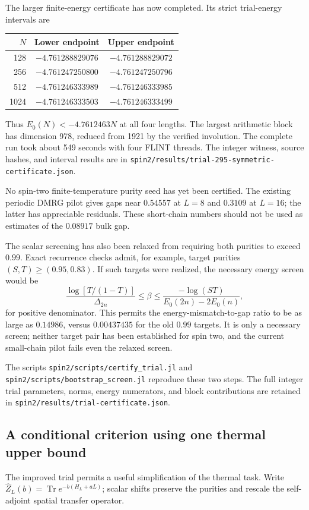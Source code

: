 \documentclass[11pt]{article}
\newcommand{\Tr}{\operatorname{Tr}}
\begin{document}
The larger finite-energy certificate has now completed. Its strict trial-energy
intervals are
\begin{center}
\begin{tabular}{rcc}
\toprule
$N$ & Lower endpoint & Upper endpoint\\
\midrule
128 & $-4.761288829076$ & $-4.761288829072$\\
256 & $-4.761247250800$ & $-4.761247250796$\\
512 & $-4.761246333989$ & $-4.761246333985$\\
1024 & $-4.761246333503$ & $-4.761246333499$\\
\bottomrule
\end{tabular}
\end{center}
Thus $E_0(N)<-4.7612463N$ at all four lengths. The largest arithmetic block
has dimension 978, reduced from 1921 by the verified involution. The complete
run took about 549 seconds with four FLINT threads. The integer witness,
source hashes, and interval results are in
\texttt{spin2/results/trial-295-symmetric-certificate.json}.

No spin-two finite-temperature purity seed has yet been certified.
The existing periodic DMRG pilot gives gaps near $0.54557$ at $L=8$ and
$0.3109$ at $L=16$; the latter has appreciable residuals. These short-chain
numbers should not be used as estimates of the $0.08917$ bulk gap.

The scalar screening has also been relaxed from requiring both purities to
exceed $0.99$. Exact recurrence checks admit, for example, target purities
$(S,T)\ge(0.95,0.83)$. If such targets were realized, the necessary energy
screen would be
\[
 \frac{\log[T/(1-T)]}{\Delta_{2n}}\le\beta
 \le\frac{-\log(ST)}{E_0(2n)-2E_0(n)},
\]
for positive denominator. This permits the energy-mismatch-to-gap ratio to
be as large as $0.14986$, versus $0.00437435$ for the old $0.99$ targets.
It is only a necessary screen; neither target pair has been established for
spin two, and the current small-chain pilot fails even the relaxed screen.

The scripts \texttt{spin2/scripts/certify\_trial.jl} and
\texttt{spin2/scripts/bootstrap\_screen.jl} reproduce these two steps.
The full integer trial parameters, norms, energy numerators, and block
contributions are retained in \texttt{spin2/results/trial-certificate.json}.

\subsection{A conditional criterion using one thermal upper bound}
The improved trial permits a useful simplification of the thermal task.
Write $\widehat Z_L(b)=\Tr e^{-b(H_L+aL)}$; scalar shifts preserve the purities
and rescale the self-adjoint spatial transfer operator.
\end{document}
